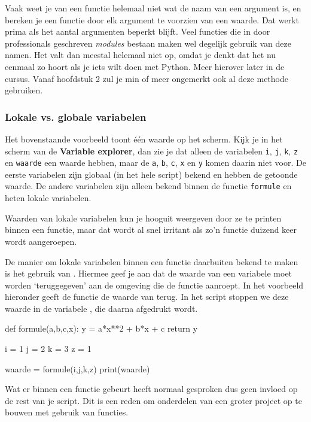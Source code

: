 \documentclass[a4paper,11pt, fleqn]{article}
\begin{document}
Vaak weet je van een functie helemaal niet wat de naam van een argument is, en bereken je een functie door elk argument te voorzien van een waarde. Dat werkt prima als het aantal argumenten beperkt blijft. 
Veel functies die in door professionals geschreven \textit{modules} bestaan maken wel degelijk gebruik van deze namen. Het valt dan meestal helemaal niet op, omdat je denkt dat het nu eenmaal zo hoort als je iets wilt doen met Python.
Meer hierover later in de cursus. Vanaf hoofdstuk 2 zul je min of meer ongemerkt ook al deze methode gebruiken.

\subsubsection{Lokale vs. globale variabelen}
Het bovenstaande voorbeeld toont \'e\'en waarde op het scherm. Kijk je in het scherm van de \textbf{Variable explorer}, dan zie je dat alleen de variabelen \verb.i., \verb.j., \verb.k., \verb.z. en \verb.waarde. een waarde hebben, maar de \verb.a., \verb.b., \verb.c., \verb.x. en \verb.y. komen daarin niet voor.
De eerste variabelen zijn globaal (in het hele script) bekend en hebben de getoonde waarde. De andere variabelen zijn alleen bekend binnen de functie \verb.formule. en heten lokale variabelen. 

Waarden van lokale variabelen kun je hooguit weergeven door ze te printen binnen een functie, maar dat wordt al snel irritant als zo'n functie duizend keer wordt aangeroepen. 

De manier om lokale variabelen binnen een functie daarbuiten bekend te maken is het gebruik van . Hiermee geef je aan dat de waarde van een variabele moet worden `teruggegeven' aan de omgeving die de functie aanroept. In het voorbeeld hieronder geeft de functie  de waarde van  terug. In het script stoppen we deze waarde in de variabele , die daarna afgedrukt wordt.

\begin{python}
def formule(a,b,c,x):
    y = a*x**2 + b*x + c
    return y

i = 1
j = 2
k = 3
z = 1

waarde = formule(i,j,k,z)
print(waarde)
\end{python}

Wat er binnen een functie gebeurt heeft normaal gesproken dus geen invloed op de rest van je script. Dit is een reden om onderdelen van een groter project op te bouwen met gebruik van functies.
\end{document}
